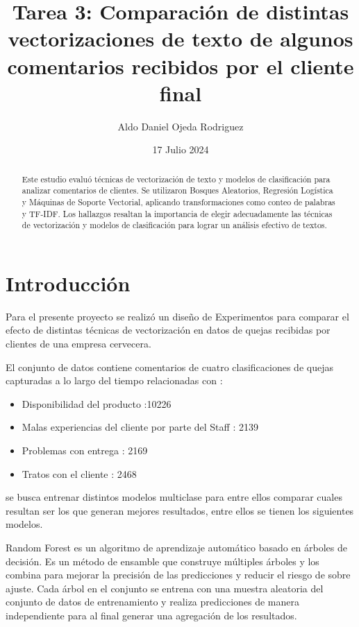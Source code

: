 \documentclass[a4paper,12pt]{article}
\title{Tarea 3: Comparación de distintas vectorizaciones de texto de algunos comentarios recibidos por el cliente final }
\author{Aldo Daniel Ojeda Rodriguez}
\date{17 Julio 2024}
\begin{document}
\maketitle

\begin{abstract}

 
Este estudio evaluó técnicas de vectorización de texto y modelos de clasificación para analizar comentarios de clientes. Se utilizaron Bosques Aleatorios, Regresión Logística y Máquinas de Soporte Vectorial, aplicando transformaciones como conteo de palabras y TF-IDF. Los hallazgos resaltan la importancia de elegir adecuadamente las técnicas de vectorización y modelos de clasificación para lograr un análisis efectivo de textos.

\end{abstract}

\section{Introducción}

Para el presente proyecto se realizó un diseño de Experimentos para comparar el efecto de distintas técnicas de vectorización en datos de quejas recibidas por clientes de una empresa cervecera.

El conjunto de datos contiene comentarios de cuatro clasificaciones de quejas capturadas a lo largo del tiempo relacionadas con : 

\begin{itemize}
    \item Disponibilidad del producto :10226
    \item Malas experiencias del cliente por parte del Staff : 2139
    \item Problemas con entrega : 2169
    \item Tratos con el cliente : 2468
\end{itemize}

se busca entrenar distintos modelos multiclase para entre ellos comparar cuales resultan ser los que generan mejores resultados, entre ellos se tienen los siguientes modelos.

Random Forest es un algoritmo de aprendizaje automático basado en árboles de decisión. Es un método de ensamble que construye múltiples árboles y los combina para mejorar la precisión de las predicciones y reducir el riesgo de sobre ajuste. Cada árbol en el conjunto se entrena con una muestra aleatoria del conjunto de datos de entrenamiento y realiza predicciones de manera independiente para al final generar una agregación de los resultados\cite{rf}.
\end{document}
